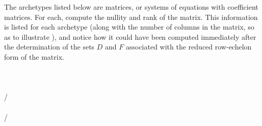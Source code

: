The archetypes listed below are matrices, or systems of equations with coefficient matrices.  For each, compute the nullity and rank of the matrix.  This information is listed for each archetype (along with the number of columns in the matrix, so as to illustrate ), and notice how it could have been computed immediately after the determination of the sets $D$ and $F$ associated with the reduced row-echelon form of the matrix.\\[4pt]
%
\\ 
\\ 
\\ 
/\\ 
\\ 
/\\ 
\\
\\
%
\\
